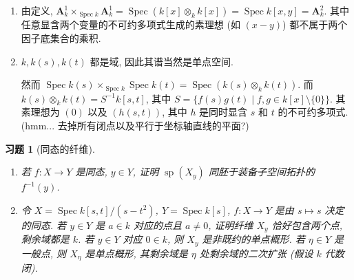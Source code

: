 \documentclass{article}
\theoremstyle{exercise}
\newtheorem{exercise}{习题}[section]
\newenvironment{proofc}{\proof}{\endproof}
\def\uA{\mathbf{A}}
\def\spp{\operatorname{sp}}
\def\Spec{\operatorname{Spec}}
\begin{document}
\begin{proofc}
  \begin{enumerate}[label={(\alph*)}]
    \item 由定义, $\uA_k^1 \times_{\Spec k} \uA_k^1 = \Spec (k[x] \otimes_k k[x]) = \Spec k[x, y] = \uA_k^2$.
          其中任意显含两个变量的不可约多项式生成的素理想
          (如 $(x - y)$) 都不属于两个因子底集合的乘积.
    \item $k, k(s), k(t)$ 都是域, 因此其谱当然是单点空间.

          然而 $\Spec k(s) \times_{\Spec k} \Spec k(t) = \Spec (k(s) \otimes_k k(t))$.
          而 $k(s) \otimes_k k(t) = S^{-1} k[s, t]$,
          其中 $S = \{ f(s) g(t) \mid f, g \in k[x] \setminus \{ 0 \} \}$.
          其素理想为 $(0)$ 以及 $(h(s, t))$, 其中 $h$ 是同时显含 $s$ 和 $t$ 的不可约多项式.
          (hmm... 去掉所有闭点以及平行于坐标轴直线的平面?)
          \qedhere
  \end{enumerate}
\end{proofc}

\begin{exercise}[同态的纤维]
  \begin{enumerate}[label={(\alph*)}]
    \item 若 $f \colon X \to Y$ 是同态, $y \in Y$,
          证明 $\spp(X_y)$ 同胚于装备子空间拓扑的 $f^{-1}(y)$.
    \item 令 $X = \Spec k[s, t] / (s - t^2)$, $Y = \Spec k[s]$,
          $f \colon X \to Y$ 是由 $s \mapsto s$ 决定的同态.
          若 $y \in Y$ 是 $a \in k$ 对应的点且 $a \neq 0$,
          证明纤维 $X_y$ 恰好包含两个点, 剩余域都是 $k$.
          若 $y \in Y$ 对应 $0 \in k$, 则 $X_y$ 是非既约的单点概形.
          若 $\eta \in Y$ 是一般点, 则 $X_{\eta}$ 是单点概形,
          其剩余域是 $\eta$ 处剩余域的二次扩张 (假设 $k$ 代数闭).
  \end{enumerate}
\end{exercise}
\end{document}
